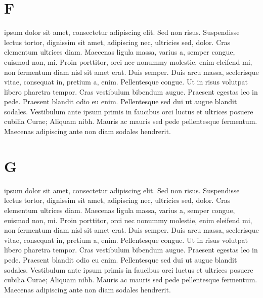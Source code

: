 \documentclass{article}
\begin{document}
\pend
\endnumbering
{}
\section{F}


\beginnumbering
\pstart
{}       ipsum dolor sit amet, consectetur adipiscing elit. Sed non risus. Suspendisse lectus tortor, dignissim sit amet, adipiscing nec, ultricies sed, dolor. Cras elementum ultrices diam. Maecenas ligula massa, varius a, semper congue, euismod non, mi. Proin porttitor, orci nec nonummy molestie, enim  eleifend mi, non fermentum diam nisl sit amet erat. Duis semper. Duis arcu massa, scelerisque vitae, consequat in, pretium a, enim. Pellentesque congue. Ut in risus volutpat libero pharetra tempor. Cras vestibulum bibendum augue. Praesent egestas leo in pede. Praesent blandit odio eu enim. Pellentesque sed dui ut augue blandit sodales. Vestibulum ante ipsum primis in faucibus orci luctus et ultrices posuere cubilia Curae; Aliquam nibh. Mauris ac mauris sed pede pellentesque fermentum. Maecenas adipiscing ante non diam sodales hendrerit. 

\pend
\endnumbering

\section{G}


\beginnumbering
\pstart
{}       ipsum dolor sit amet, consectetur adipiscing elit. Sed non risus. Suspendisse lectus tortor, dignissim sit amet, adipiscing nec, ultricies sed, dolor. Cras elementum ultrices diam. Maecenas ligula massa, varius a, semper congue, euismod non, mi. Proin porttitor, orci nec nonummy molestie, enim  eleifend mi, non fermentum diam nisl sit amet erat. Duis semper. Duis arcu massa, scelerisque vitae, consequat in, pretium a, enim. Pellentesque congue. Ut in risus volutpat libero pharetra tempor. Cras vestibulum bibendum augue. Praesent egestas leo in pede. Praesent blandit odio eu enim. Pellentesque sed dui ut augue blandit sodales. Vestibulum ante ipsum primis in faucibus orci luctus et ultrices posuere cubilia Curae; Aliquam nibh. Mauris ac mauris sed pede pellentesque fermentum. Maecenas adipiscing ante non diam sodales hendrerit. 
\end{document}
